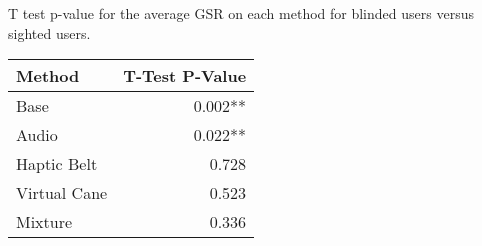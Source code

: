 
\centering
\caption{T test p-value for the average GSR on each method for blinded users versus sighted users.}
\label{tab:ttest_gsr_avg}
\begin{tabular}{lr}
\toprule
      Method & T-Test P-Value \\
\midrule
        Base &        0.002** \\
       Audio &        0.022** \\
 Haptic Belt &          0.728 \\
Virtual Cane &          0.523 \\
     Mixture &          0.336 \\
\bottomrule
\end{tabular}
